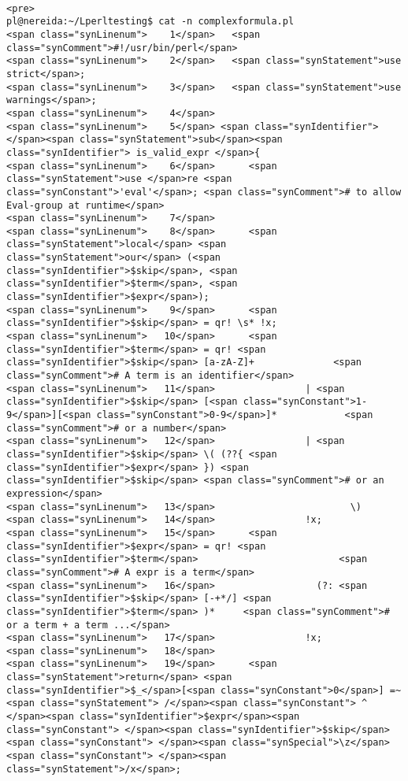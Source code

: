 \begin{verbatim}

<pre>
pl@nereida:~/Lperltesting$ cat -n complexformula.pl
<span class="synLinenum">    1</span>   <span class="synComment">#!/usr/bin/perl</span>
<span class="synLinenum">    2</span>   <span class="synStatement">use strict</span>;
<span class="synLinenum">    3</span>   <span class="synStatement">use warnings</span>;
<span class="synLinenum">    4</span> 
<span class="synLinenum">    5</span> <span class="synIdentifier">  </span><span class="synStatement">sub</span><span class="synIdentifier"> is_valid_expr </span>{
<span class="synLinenum">    6</span>      <span class="synStatement">use </span>re <span class="synConstant">'eval'</span>; <span class="synComment"># to allow Eval-group at runtime</span>
<span class="synLinenum">    7</span> 
<span class="synLinenum">    8</span>      <span class="synStatement">local</span> <span class="synStatement">our</span> (<span class="synIdentifier">$skip</span>, <span class="synIdentifier">$term</span>, <span class="synIdentifier">$expr</span>);
<span class="synLinenum">    9</span>      <span class="synIdentifier">$skip</span> = qr! \s* !x;
<span class="synLinenum">   10</span>      <span class="synIdentifier">$term</span> = qr! <span class="synIdentifier">$skip</span> [a-zA-Z]+              <span class="synComment"># A term is an identifier</span>
<span class="synLinenum">   11</span>                | <span class="synIdentifier">$skip</span> [<span class="synConstant">1-9</span>][<span class="synConstant">0-9</span>]*            <span class="synComment"># or a number</span>
<span class="synLinenum">   12</span>                | <span class="synIdentifier">$skip</span> \( (??{ <span class="synIdentifier">$expr</span> }) <span class="synIdentifier">$skip</span> <span class="synComment"># or an expression</span>
<span class="synLinenum">   13</span>                        \)
<span class="synLinenum">   14</span>                !x;
<span class="synLinenum">   15</span>      <span class="synIdentifier">$expr</span> = qr! <span class="synIdentifier">$term</span>                         <span class="synComment"># A expr is a term</span>
<span class="synLinenum">   16</span>                  (?: <span class="synIdentifier">$skip</span> [-+*/] <span class="synIdentifier">$term</span> )*     <span class="synComment"># or a term + a term ...</span>
<span class="synLinenum">   17</span>                !x;
<span class="synLinenum">   18</span> 
<span class="synLinenum">   19</span>      <span class="synStatement">return</span> <span class="synIdentifier">$_</span>[<span class="synConstant">0</span>] =~<span class="synStatement"> /</span><span class="synConstant"> ^ </span><span class="synIdentifier">$expr</span><span class="synConstant"> </span><span class="synIdentifier">$skip</span><span class="synConstant"> </span><span class="synSpecial">\z</span><span class="synConstant"> </span><span class="synStatement">/x</span>;

\end{verbatim}
